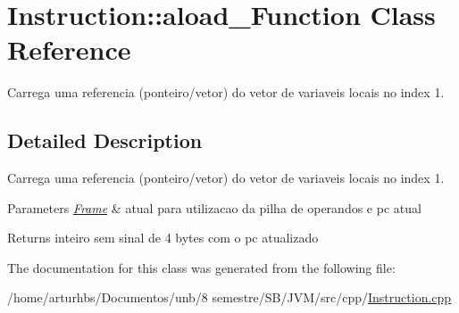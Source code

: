 \hypertarget{classInstruction_1_1aload__1Function}{}\section{Instruction\+:\+:aload\+\_\+Function Class Reference}
\label{classInstruction_1_1aload__1Function}


Carrega uma referencia (ponteiro/vetor) do vetor de variaveis locais no index 1.  




\subsection{Detailed Description}
Carrega uma referencia (ponteiro/vetor) do vetor de variaveis locais no index 1. 


\begin{DoxyParams}{Parameters}
{\em \hyperlink{classFrame}{Frame}} & atual para utilizacao da pilha de operandos e pc atual \\
\hline
\end{DoxyParams}
\begin{DoxyReturn}{Returns}
inteiro sem sinal de 4 bytes com o pc atualizado 
\end{DoxyReturn}


The documentation for this class was generated from the following file\+:\begin{DoxyCompactItemize}
\item 
/home/arturhbs/\+Documentos/unb/8 semestre/\+S\+B/\+J\+V\+M/src/cpp/\hyperlink{Instruction_8cpp}{Instruction.\+cpp}\end{DoxyCompactItemize}
